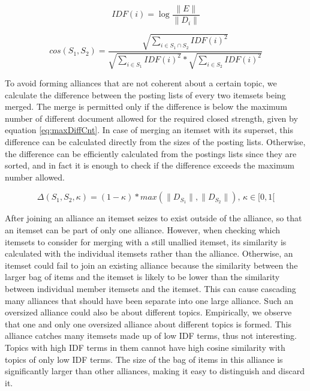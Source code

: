 \documentclass{sig-alternate}
\begin{document}
\begin{equation}\label{eq:IDF}IDF(i) = \log{\frac{\|E\|}{\|D_i\|}}\end{equation}

\begin{equation}\label{eq:cosine}cos(S_1,S_2) = \frac{\sqrt{\sum_{i \in S_1 \cap S_2} IDF(i)^2 }}{\sqrt{\sum_{i \in S_1} IDF(i)^2} * \sqrt{\sum_{i \in S_2} IDF(i)^2}} \end{equation}

To avoid forming alliances that are not coherent about a certain topic, we calculate the difference between the posting lists of every two itemsets being merged. The merge is permitted only if the difference is below the maximum number of different document allowed for the required closed strength, given by equation \ref{eq:maxDiffCnt}. In case of merging an itemset with its superset, this difference can be calculated directly from the sizes of the posting lists.
Otherwise, the difference can be efficiently calculated from the postings lists since they are sorted, and in fact it is enough to check if the difference exceeds the maximum number allowed.

\begin{equation}\label{eq:maxDiffCnt}\Delta(S_1,S_2,\kappa) = (1 - \kappa) * max(\|D_{S_1}\|,\|D_{S_2}\|), \, \kappa \in [0,1[\end{equation}

After joining an alliance an itemset seizes to exist outside of the alliance, so that an itemset can be part of only one alliance. However, when checking which itemsets to consider for merging with a still unallied itemset, its similarity is calculated with the individual itemsets rather than the alliance. Otherwise, an itemset could fail to join an existing alliance because the similarity between the larger bag of items and the itemset is likely to be lower than the similarity between individual member itemsets and the itemset. This can cause cascading many alliances that should have been separate into one large alliance. Such an oversized alliance could also be about different topics. Empirically, we observe that one and only one oversized alliance about different topics is formed. This alliance catches many itemsets made up of low IDF terms, thus not interesting. Topics with high IDF terms in them cannot have high cosine similarity with topics of only low IDF terms. The size of the bag of items in this alliance is significantly larger than other alliances, making it easy to distinguish and discard it.
\end{document}
